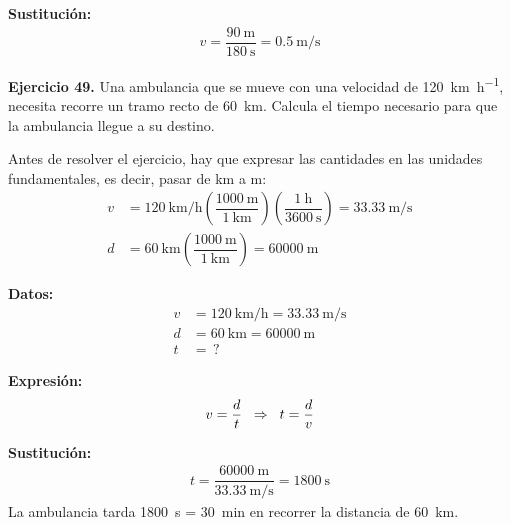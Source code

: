 \documentclass[14pt]{extarticle}
\begin{document}
\vspace*{0.3cm}
\textbf{Sustitución:}
\begin{align*}
v = \dfrac{\SI{90}{\meter}}{\SI{180}{\second}} = \SI[per-mode=fraction]{0.5}{\meter\per\second}
\end{align*}

\vspace*{0.3cm}
\textbf{Ejercicio 49. } Una ambulancia que se mueve con una velocidad de \SI{120}{\kilo\meter\per\hour}, necesita recorre un tramo recto de \SI{60}{\kilo\meter}. Calcula el tiempo necesario para que la ambulancia llegue a su destino.

Antes de resolver el ejercicio, hay que expresar las cantidades en las unidades fundamentales, es decir, pasar de \unit{\kilo\meter} a \unit{\meter}:
\begin{align*}
v &= \SI[per-mode=fraction]{120}{\kilo\meter\per\hour} \left( \dfrac{\SI{1000}{\meter}}{\SI{1}{\kilo\meter}} \right)\left( \dfrac{\SI{1}{\hour}}{\SI{3600}{\second}} \right) = \SI[per-mode=fraction]{33.33}{\meter\per\second} \\[0.5em]
d &= \SI{60}{\kilo\meter} \left( \dfrac{\SI{1000}{\meter}}{\SI{1}{\kilo\meter}}\right) = \SI{60000}{\meter}
\end{align*}

\vspace*{0.3cm}
\begin{minipage}[t]{0.4\linewidth}
\textbf{Datos:}
\begin{align*}
v &= \SI{120}{\kilo\meter\per\hour} = \SI[per-mode=fraction]{33.33}{\meter\per\second} \\
d &= \SI{60}{\kilo\meter} = \SI{60000}{\meter} \\
t &= \, ?
\end{align*}
\end{minipage}
\begin{minipage}[t]{0.4\linewidth}
\textbf{Expresión:}
\begin{align*}
v = \dfrac{d}{t} \hspace{0.2cm} \Rightarrow \hspace{0.2cm} t = \dfrac{d}{v}
\end{align*}
\end{minipage}

\vspace{0.3cm}
\textbf{Sustitución:}
\begin{align*}
t = \dfrac{\SI{60000}{\meter}}{ \displaystyle \SI[per-mode=fraction]{33.33}{\meter\per\second}} = \SI{1800}{\second}
\end{align*}
La ambulancia tarda \SI{1800}{\second} = \SI{30}{\minute} en recorrer la distancia de \SI{60}{\kilo\meter}.
\end{document}
